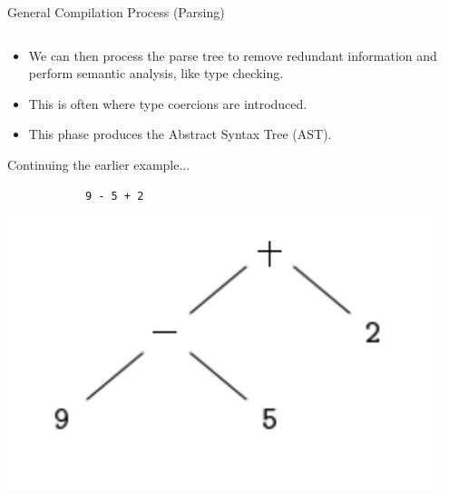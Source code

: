 \documentclass{beamer}
\begin{document}
\begin{frame}[fragile]{General Compilation Process (Parsing)}
\begin{columns}[T,onlytextwidth]
        \begin{overprint}
            \begin{itemize}
                \item We can then process the parse tree to remove redundant information and perform semantic analysis, like type checking.
                \item This is often where type coercions are introduced.
                \item This phase produces the Abstract Syntax Tree (AST).
            \end{itemize}

            Continuing the earlier example...
            \begin{lstlisting}
            9 - 5 + 2
            \end{lstlisting}

            \includegraphics[width=0.95\textwidth]{images/ast.png}\cite{compilers}
        \end{overprint}


\end{columns}
\end{frame}
\end{document}
